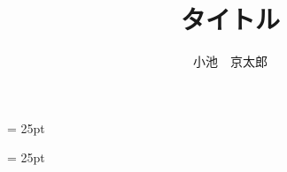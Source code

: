 \documentclass[12pt]{b_thesis}
\title{タイトル}
\author{小池　京太郎}                   %
\date{}
\begin{document}
\baselineskip = 25pt





\setcounter{page}{1}

\baselineskip = 25pt



\end{document}
